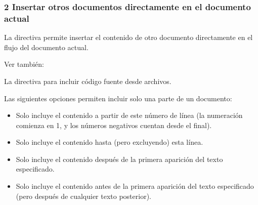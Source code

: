 \documentclass[a4paper,10pt,oneside,spanish,openany]{sphinxmanual}
\begin{document}
\subsubsection{2 Insertar otros documentos directamente en el documento actual}
\label{\detokenize{configuracion_inicial/013.guia_de_myst_parser:insertar-otros-documentos-directamente-en-el-documento-actual}}
\sphinxAtStartPar
La directiva  permite insertar el contenido de otro documento directamente en el flujo del documento actual.


\begin{sphinxseealso}{Ver también:}

\sphinxAtStartPar
La directiva {\hyperref[\detokenize{configuracion_inicial/013.guia_de_myst_parser:syntax/literalinclude}]{}} para incluir código fuente desde archivos.


\end{sphinxseealso}


\sphinxAtStartPar
Las siguientes opciones permiten incluir solo una parte de un documento:
\begin{itemize}
\item {} 
\sphinxAtStartPar
{} Solo incluye el contenido a partir de este número de línea (la numeración comienza en 1, y los números negativos cuentan desde el final).

\item {} 
\sphinxAtStartPar
{} Solo incluye el contenido hasta (pero excluyendo) esta línea.

\item {} 
\sphinxAtStartPar
{} Solo incluye el contenido después de la primera aparición del texto especificado.

\item {} 
\sphinxAtStartPar
{} Solo incluye el contenido antes de la primera aparición del texto especificado (pero después de cualquier texto posterior).

\end{itemize}
\end{document}
